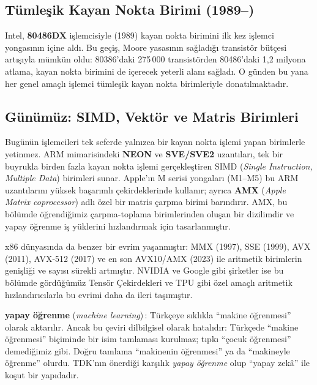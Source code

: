 \subsection{Tümleşik Kayan Nokta Birimi (1989--)}
Intel, \textbf{80486DX} işlemcisiyle (1989) kayan nokta birimini ilk kez işlemci yongasının içine aldı. Bu geçiş, Moore yasasının sağladığı transistör bütçesi artışıyla mümkün oldu: 80386'daki 275\,000 transistörden 80486'daki 1,2 milyona atlama, kayan nokta birimini de içerecek yeterli alanı sağladı. O günden bu yana her genel amaçlı işlemci tümleşik kayan nokta birimleriyle donatılmaktadır.

\subsection{Günümüz: SIMD, Vektör ve Matris Birimleri}
Bugünün işlemcileri tek seferde yalnızca bir kayan nokta işlemi yapan birimlerle yetinmez. ARM mimarisindeki \textbf{NEON} ve \textbf{SVE/SVE2} uzantıları, tek bir buyrukla birden fazla kayan nokta işlemi gerçekleştiren SIMD (\emph{Single Instruction, Multiple Data}) birimleri sunar. Apple'ın M serisi yongaları (M1--M5) bu ARM uzantılarını yüksek başarımlı çekirdeklerinde kullanır; ayrıca \textbf{AMX} (\emph{Apple Matrix coprocessor}) adlı özel bir matris çarpma birimi barındırır. AMX, bu bölümde öğrendiğimiz çarpma-toplama birimlerinden oluşan bir dizilimdir ve yapay öğrenme iş yüklerini hızlandırmak için tasarlanmıştır.

x86 dünyasında da benzer bir evrim yaşanmıştır: MMX (1997), SSE (1999), AVX (2011), AVX-512 (2017) ve en son AVX10/AMX (2023) ile aritmetik birimlerin genişliği ve sayısı sürekli artmıştır. NVIDIA ve Google gibi şirketler ise bu bölümde gördüğümüz Tensör Çekirdekleri ve TPU gibi özel amaçlı aritmetik hızlandırıcılarla bu evrimi daha da ileri taşımıştır.

\begin{terimnotu}
\textbf{yapay öğrenme} (\emph{machine learning})\,: Türkçeye sıklıkla ``makine öğrenmesi'' olarak aktarılır. Ancak bu çeviri dilbilgisel olarak hatalıdır: Türkçede ``makine öğrenmesi'' biçiminde bir isim tamlaması kurulmaz; tıpkı ``çocuk öğrenmesi'' demediğimiz gibi. Doğru tamlama ``makinenin öğrenmesi'' ya da ``makineyle öğrenme'' olurdu. TDK'nın önerdiği karşılık \emph{yapay öğrenme} olup ``yapay zekâ'' ile koşut bir yapıdadır.
\end{terimnotu}

